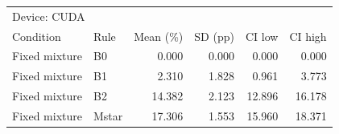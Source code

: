 \begin{tabular}{llrrrr}
\toprule
\multicolumn{6}{l}{Device: CUDA} \\
Condition & Rule & Mean (\%) & SD (pp) & CI low & CI high \\
\midrule
Fixed mixture & B0 & 0.000 & 0.000 & 0.000 & 0.000 \\
Fixed mixture & B1 & 2.310 & 1.828 & 0.961 & 3.773 \\
Fixed mixture & B2 & 14.382 & 2.123 & 12.896 & 16.178 \\
Fixed mixture & Mstar & 17.306 & 1.553 & 15.960 & 18.371 \\
\bottomrule
\end{tabular}
